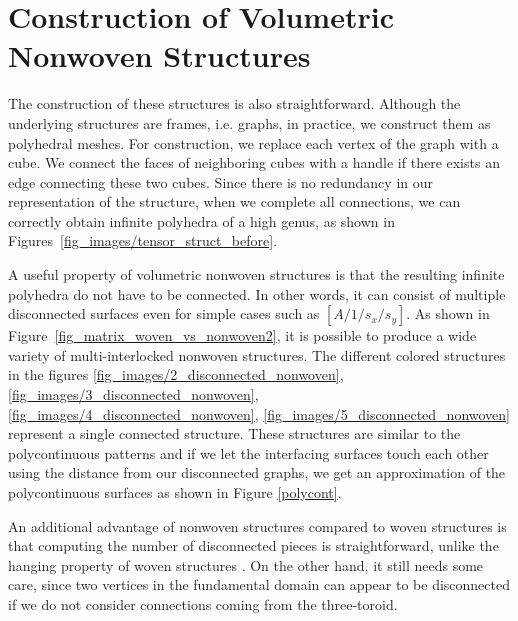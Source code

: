 \documentclass[times,twocolumn,final]{elsarticle}
\begin{document}
\section{Construction of Volumetric Nonwoven Structures}
\label{Sec_Construction_of_NWS}

The construction of these structures is also straightforward. Although the underlying structures are frames, i.e. graphs, in practice, we construct them as polyhedral meshes. For construction, we replace each vertex of the graph with a cube. We connect the faces of neighboring cubes with a handle \cite{srinivasan2002interactive} if there exists an edge connecting these two cubes. Since there is no redundancy in our representation of the structure, when we complete all connections, we can correctly obtain infinite polyhedra of a high genus, as shown in Figures~\ref{fig_images/tensor_struct_before}. 

A useful property of volumetric nonwoven structures is that the resulting infinite polyhedra do not have to be connected. In other words, it can consist of multiple disconnected surfaces even for simple cases such as $[A/1/s_x/s_y]$. As shown in Figure~\ref{fig_matrix_woven_vs_nonwoven2}, it is possible to produce a wide variety of multi-interlocked nonwoven structures. The different colored structures in the figures \ref{fig_images/2_disconnected_nonwoven}, \ref{fig_images/3_disconnected_nonwoven}, \ref{fig_images/4_disconnected_nonwoven}, \ref{fig_images/5_disconnected_nonwoven} represent a single connected structure. These structures are similar to the polycontinuous patterns\cite{sakata2022polycont} and if we let the interfacing surfaces touch each other using the distance from our disconnected graphs, we get an approximation of the polycontinuous surfaces as shown in Figure \ref{polycont}.

An additional advantage of nonwoven structures compared to woven structures is that computing the number of disconnected pieces is straightforward, unlike the hanging property of woven structures \cite{clapham1980when}. On the other hand, it still needs some care, since two vertices in the fundamental domain can appear to be disconnected if we do not consider connections coming from the three-toroid. 
\end{document}
